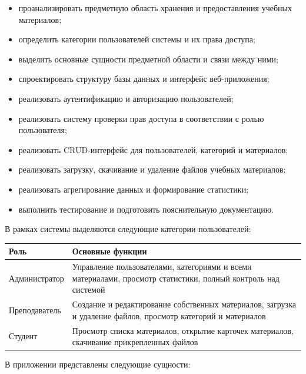 \documentclass[14pt,a4paper]{extarticle}
\begin{document}
\begin{itemize}[leftmargin=1.25cm]
    \item проанализировать предметную область хранения и предоставления учебных материалов;
    \item определить категории пользователей системы и их права доступа;
    \item выделить основные сущности предметной области и связи между ними;
    \item спроектировать структуру базы данных и интерфейс веб-приложения;
    \item реализовать аутентификацию и авторизацию пользователей;
    \item реализовать систему проверки прав доступа в соответствии с ролью пользователя;
    \item реализовать CRUD-интерфейс для пользователей, категорий и материалов;
    \item реализовать загрузку, скачивание и удаление файлов учебных материалов;
    \item реализовать агрегирование данных и формирование статистики;
    \item выполнить тестирование и подготовить пояснительную документацию.
\end{itemize}

В рамках системы выделяются следующие категории пользователей:

\begin{center}
\small\begin{tabularx}{0.96\textwidth}{>{\raggedright\arraybackslash}p{4.2cm} >{\raggedright\arraybackslash}X}
\toprule
\textbf{Роль} & \textbf{Основные функции} \\
\midrule
Администратор & Управление пользователями, категориями и всеми материалами, просмотр статистики, полный контроль над системой \\
Преподаватель & Создание и редактирование собственных материалов, загрузка и удаление файлов, просмотр категорий и материалов \\
Студент & Просмотр списка материалов, открытие карточек материалов, скачивание прикрепленных файлов \\
\bottomrule
\end{tabularx}
\end{center}

В приложении представлены следующие сущности:
\end{document}
